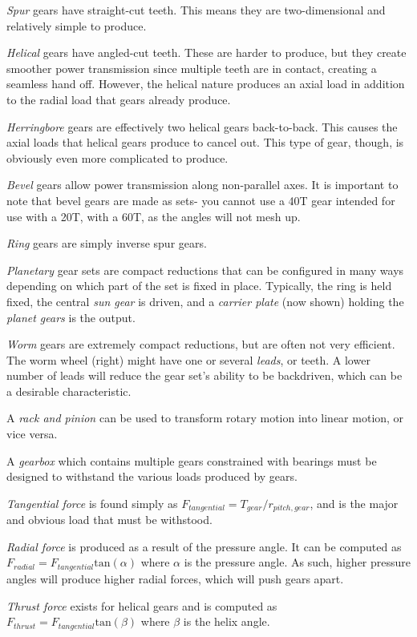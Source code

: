 \begin{asparaenum}[a)]
	\item \textit{Spur} gears have straight-cut teeth. This means they are two-dimensional and relatively simple to produce.
	\item \textit{Helical} gears have angled-cut teeth. These are harder to produce, but they create smoother power transmission since multiple teeth are in contact, creating a seamless hand off. However, the helical nature produces an axial load in addition to the radial load that gears already produce. 
	\item \textit{Herringbore} gears are effectively two helical gears back-to-back. This causes the axial loads that helical gears produce to cancel out. This type of gear, though, is obviously even more complicated to produce.
	\item \textit{Bevel} gears allow power transmission along non-parallel axes. It is important to note that bevel gears are made as sets- you cannot use a 40T gear intended for use with a 20T, with a 60T, as the angles will not mesh up.
	\item \textit{Ring} gears are simply inverse spur gears.
	\item \textit{Planetary} gear sets are compact reductions that can be configured in many ways depending on which part of the set is fixed in place. Typically, the ring is held fixed, the central \textit{sun gear} is driven, and a \textit{carrier plate} (now shown) holding the \textit{planet gears} is the output.
	\item \textit{Worm} gears are extremely compact reductions, but are often not very efficient. The worm wheel (right) might have one or several \textit{leads}, or teeth. A lower number of leads will reduce the gear set's ability to be backdriven, which can be a desirable characteristic.
	\item A \textit{rack and pinion} can be used to transform rotary motion into linear motion, or vice versa.	
\end{asparaenum}

A \textit{gearbox} which contains multiple gears constrained with bearings must be designed to withstand the various loads produced by gears.
\begin{asparaenum}[a)]
	\item \textit{Tangential force} is found simply as $F_{tangential} = T_{gear} / r_{pitch, gear}$, and is the major and obvious load that must be withstood.
	\item \textit{Radial force} is produced as a result of the pressure angle. It can be computed as $F_{radial} = F_{tangential} \text{tan}(\alpha)$ where $\alpha$ is the pressure angle. As such, higher pressure angles will produce higher radial forces, which will push gears apart.
	\item \textit{Thrust force} exists for helical gears and is computed as $F_{thrust} = F_{tangential} \text{tan}(\beta)$ where $\beta$ is the helix angle.
\end{asparaenum}

